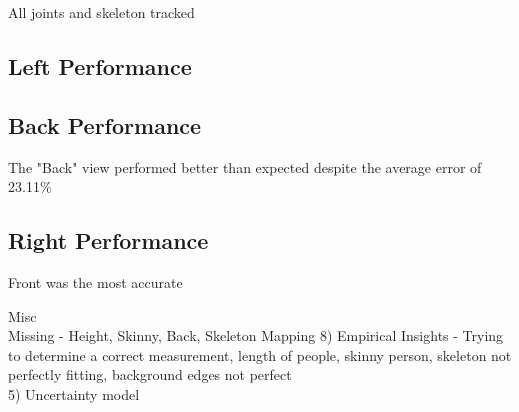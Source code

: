 All joints and skeleton tracked 

\subsection{Left Performance}

\subsection{Back Performance}

The "Back" view performed better than expected despite the average error of 23.11\%

\subsection{Right Performance}

Front was the most accurate

Misc\\
Missing - Height, Skinny, Back, Skeleton Mapping
8) Empirical Insights - Trying to determine a correct measurement,  length of people, skinny person, skeleton not perfectly fitting, background edges not perfect \\

5) Uncertainty model\\

\fi
